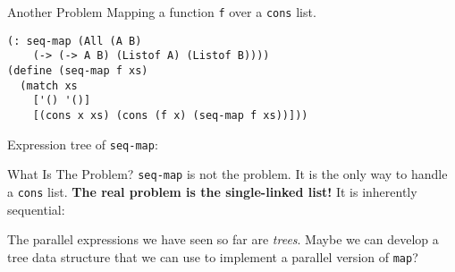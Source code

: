 \documentclass{beamer}
\begin{document}
\begin{frame}[fragile]{Another Problem}
Mapping a function \lstinline{f} over a \lstinline{cons} list.

\begin{lstlisting}
(: seq-map (All (A B)
    (-> (-> A B) (Listof A) (Listof B))))
(define (seq-map f xs)
  (match xs
    ['() '()]
    [(cons x xs) (cons (f x) (seq-map f xs))]))
\end{lstlisting}

\pause{} \vspace{.5cm}

Expression tree of \lstinline{seq-map}:

  \begin{center}
  \end{center}
\end{frame}

\begin{frame}{What Is The Problem?}
  \lstinline{seq-map} is not the problem. It is the only way to handle a \lstinline{cons} list. \textbf{The real problem is the single-linked list!} It is inherently sequential:

\pause{} \vspace{0.5cm}

\begin{center}
\end{center}

\pause{} \vspace{0.5cm}

The parallel expressions we have seen so far are \emph{trees}. Maybe we can develop a tree data structure that we can use to implement a parallel version of \lstinline{map}?
\end{frame}
\end{document}
